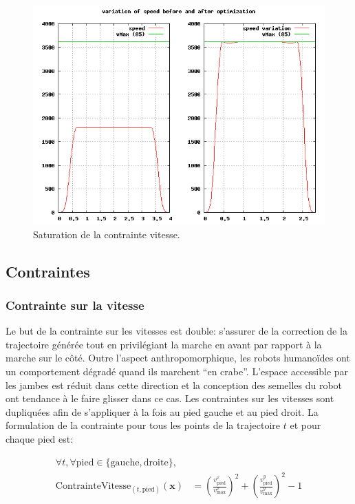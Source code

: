 \begin{figure}[htbp]
  \begin{center}
\includegraphics[width=\linewidth]{src/chap1-roboptim/time-optimization.png}
  \end{center}
  \caption{Saturation de la contrainte vitesse. \label{fig:speed}}
\end{figure}


\subsection{Contraintes}

\subsubsection{Contrainte sur la vitesse}

Le but de la contrainte sur les vitesses est double: s'assurer de la
correction de la trajectoire générée tout en privilégiant la marche en
avant par rapport à la marche sur le côté. Outre l'aspect
anthropomorphique, les robots humanoïdes ont un comportement dégradé
quand ils marchent ``en crabe''. L'espace accessible par les jambes
est réduit dans cette direction et la conception des semelles du robot
ont tendance à le faire glisser dans ce cas. Les contraintes sur les
vitesses sont dupliquées afin de s'appliquer à la fois au pied gauche
et au pied droit. La formulation de la contrainte pour tous les points
de la trajectoire $t$ et pour chaque pied est:

\begin{equation}
  \begin{split}
  \forall t, \forall \text{pied} \in \{\text{gauche}, \text{droite}\}, &\\
  \text{ContrainteVitesse}_{(t,\text{pied})}(\mathbf{x}) & =
  (\frac{v_{\text{pied}}^{x}}{v_{\text{max}}^{x}})^2 +
  (\frac{v_{\text{pied}}^{y}}{v_{\text{max}}^{y}})^2 - 1
  \end{split}
\end{equation}

